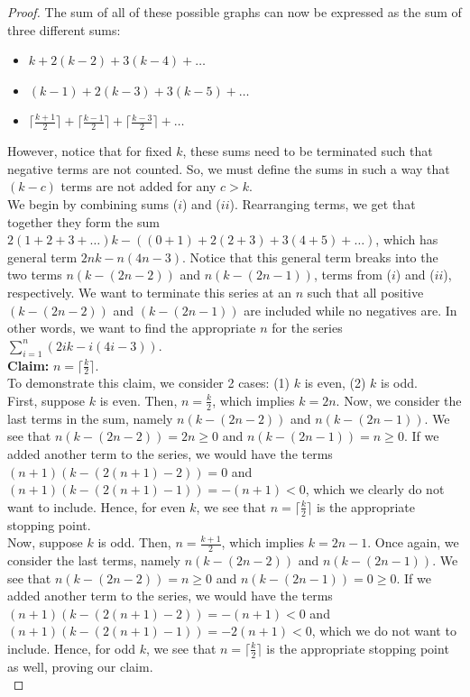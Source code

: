 \documentclass[10pt,a4paper]{amsart}
\begin{document}
\begin{proof}
    The sum of all of these possible graphs can now be expressed as the sum of three different sums:
    \begin{itemize}
        \item [($i$)] $k + 2(k-2) + 3(k-4) + \dots $
        \item [($ii$)] $(k-1) + 2(k-3) + 3(k-5) + \dots $
        \item [($iii$)] $\lceil\frac{k+1}{2}\rceil + \lceil\frac{k-1}{2}\rceil + \lceil\frac{k-3}{2}\rceil + \dots $
    \end{itemize}
    However, notice that for fixed $k$, these sums need to be terminated such that negative terms are not counted. So, we must define the sums in such a way that $(k-c)$ terms are not added for any $c>k$. \\
    We begin by combining sums ($i$) and ($ii$). Rearranging terms, we get that together they form the sum $2(1+2+3+\dots )k - ((0+1) + 2(2+3) + 3(4+5) + \dots )$, which has general term $2nk - n(4n-3)$. Notice that this general term breaks into the two terms $n(k - (2n-2))$ and $n(k-(2n-1))$, terms from ($i$) and ($ii$), respectively. We want to terminate this series at an $n$ such that all positive $(k-(2n-2))$ and $(k-(2n-1))$ are included while no negatives are. In other words, we want to find the appropriate $n$ for the series $\sum_{i=1}^n (2ik - i(4i-3))$. \\
    
    \textbf{Claim:} $n = \lceil\frac{k}{2}\rceil$. \\

    To demonstrate this claim, we consider 2 cases: (1) $k$ is even, (2) $k$ is odd. \\
    First, suppose $k$ is even. Then, $n = \frac{k}{2}$, which implies $k = 2n$. Now, we consider the last terms in the sum, namely $n(k-(2n-2))$ and $n(k-(2n-1))$. We see that $n(k-(2n-2)) = 2n\geq 0$ and $n(k-(2n-1)) = n\geq 0$. If we added another term to the series, we would have the terms $(n+1)(k-(2(n+1)-2)) = 0$ and $(n+1)(k-(2(n+1)-1)) = -(n+1) < 0$, which we clearly do not want to include. Hence, for even $k$, we see that $n = \lceil\frac{k}{2}\rceil$ is the appropriate stopping point. \\
    Now, suppose $k$ is odd. Then, $n = \frac{k+1}{2}$, which implies $k = 2n-1$. Once again, we consider the last terms, namely $n(k-(2n-2))$ and $n(k-(2n-1))$. We see that $n(k-(2n-2)) = n\geq 0$ and $n(k-(2n-1)) = 0\geq 0$. If we added another term to the series, we would have the terms $(n+1)(k-(2(n+1)-2)) = -(n+1) < 0$ and $(n+1)(k-(2(n+1)-1)) = -2(n+1) < 0$, which we do not want to include. Hence, for odd $k$, we see that $n = \lceil\frac{k}{2}\rceil$ is the appropriate stopping point as well, proving our claim. \\


\end{proof}
\end{document}
